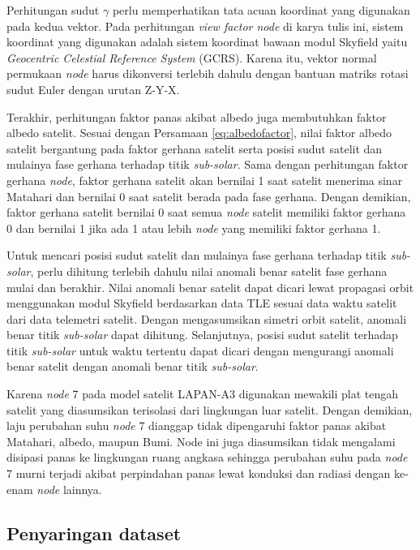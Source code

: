 Perhitungan sudut $\gamma$ perlu memperhatikan tata acuan koordinat yang
digunakan pada kedua vektor. Pada perhitungan \textit{view factor node} di
karya tulis ini, sistem koordinat yang digunakan adalah sistem koordinat bawaan
modul Skyfield yaitu \textit{Geocentric Celestial Reference System} (GCRS).
Karena itu, vektor normal permukaan \textit{node} harus dikonversi terlebih
dahulu dengan bantuan matriks rotasi sudut Euler dengan urutan Z-Y-X.

Terakhir, perhitungan faktor panas akibat albedo juga membutuhkan faktor albedo
satelit. Sesuai dengan Persamaan \ref{eq:albedofactor}, nilai faktor albedo
satelit bergantung pada faktor gerhana satelit serta posisi sudut satelit dan
mulainya fase gerhana terhadap titik \textit{sub-solar}. Sama dengan perhitungan faktor gerhana \textit{node},
faktor gerhana satelit akan bernilai 1 saat satelit menerima sinar Matahari dan
bernilai 0 saat satelit berada pada fase gerhana. Dengan demikian, faktor
gerhana satelit bernilai 0 saat semua \textit{node} satelit memiliki faktor
gerhana 0 dan bernilai 1 jika ada 1 atau lebih \textit{node} yang memiliki faktor gerhana 1.

Untuk mencari posisi sudut satelit dan mulainya fase gerhana terhadap titik \textit{sub-solar}, perlu dihitung terlebih dahulu nilai anomali benar satelit fase gerhana mulai dan berakhir. Nilai anomali benar satelit dapat dicari lewat propagasi orbit menggunakan modul Skyfield berdasarkan data TLE sesuai data waktu satelit dari data telemetri satelit. Dengan mengasumsikan simetri orbit satelit, anomali benar titik \textit{sub-solar} dapat dihitung. Selanjutnya, posisi sudut satelit terhadap titik \textit{sub-solar} untuk waktu tertentu dapat dicari dengan mengurangi anomali benar satelit dengan anomali benar titik \textit{sub-solar}.

Karena \textit{node} 7 pada model satelit LAPAN-A3 digunakan mewakili plat
tengah satelit yang diasumsikan terisolasi dari lingkungan luar satelit. Dengan
demikian, laju perubahan suhu \textit{node} 7 dianggap tidak dipengaruhi faktor
panas akibat Matahari, albedo, maupun Bumi. Node ini juga diasumsikan tidak
mengalami disipasi panas ke lingkungan ruang angkasa sehingga perubahan suhu
pada \textit{node} 7 murni terjadi akibat perpindahan panas lewat konduksi dan
radiasi dengan ke-enam \textit{node} lainnya.

\subsection{Penyaringan dataset}

